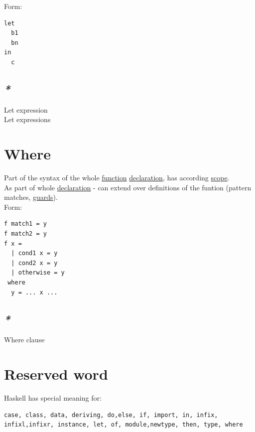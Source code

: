 \documentclass[a4paper,14pt,oneside]{book}
\begin{document}
Form:\\
\begin{verbatim}
let
  b1
  bn
in
  c
\end{verbatim}

\subsection{\emph{*}}
\label{sec:orgfe04806}

\label{org1726255}Let expression\\
\label{org1bbeaa0}Let expressions\\

\section{\label{org514c9de}Where}
\label{sec:orgfffaa82}
Part of the syntax of the whole \hyperref[orgee59a2b]{function} \hyperref[org3d8b5f9]{declaration}, has according \hyperref[orga3ec5be]{scope}.\\

As part of whole \hyperref[org3d8b5f9]{declaration} - can extend over definitions of the funtion (pattern matches, \hyperref[orgadb84b3]{guards}).\\

Form:\\
\begin{verbatim}
f match1 = y
f match2 = y
f x =
  | cond1 x = y
  | cond2 x = y
  | otherwise = y
 where
  y = ... x ...
\end{verbatim}

\subsection{\emph{*}}
\label{sec:org4de2d49}

\label{orgfc4c80c}Where clause\\

\section{\label{orgbcee4b7}Reserved word}
\label{sec:orgb73c342}
Haskell has special meaning for:\\
\begin{verbatim}
case, class, data, deriving, do,else, if, import, in, infix, infixl,infixr, instance, let, of, module,newtype, then, type, where
\end{verbatim}
\end{document}
